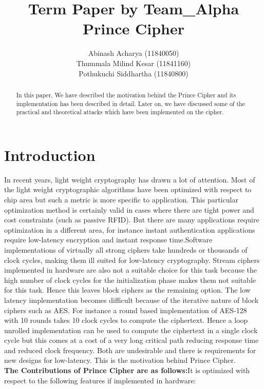 \documentclass{transcrypto}
\title{Term Paper by  Team\_Alpha \\ Prince Cipher}
\author{Abinash Acharya (11840050) \\ Thummala Milind Kesar (11841160) \\  Pothukuchi Siddhartha (11840800)}
\institute{Indian Institute of Technology Bhilai , \email{abinasha@iitbhilai.ac.in} \and Indian Institute of Technology Bhilai,\email{thummalam@iitbhilai.ac.in} \and Indian Institute of Technology Bhilai, \email{pothukuchis@iitbhilai.ac.in}}
\begin{document}
\maketitle
{} 

\begin{abstract}
In this paper, We have described the motivation behind the Prince Cipher and its implementation has been described in detail. Later on, we have discussed some of the practical and theoretical attacks which have been implemented on the cipher. 


\end{abstract}

\section{Introduction}
In recent years, light weight cryptography has drawn a lot of attention. Most of the light weight cryptographic algorithms have been optimized with respect to chip area but such a metric is more specific to application. This particular optimization method is certainly valid in cases where there are tight power and cost constraints (such as passive RFID). But there are many applications require optimization in a different area, for instance instant authentication applications require low-latency encryption and instant response time.Software implementations of virtually all strong ciphers take hundreds or thousands of clock cycles,
making them ill suited for low-latency cryptography. Stream ciphers implemented in hardware are also not a suitable choice for this task because the high number of clock cycles for the initialization phase makes them not suitable for this task. Hence this leaves block ciphers as the remaining option. The low latency implementation becomes difficult because of the iterative nature of block ciphers such as AES. For instance a round based implementation of AES-128 with 10 rounds takes 10 clock cycles to compute the ciphertext. Hence a loop unrolled implementation can be used to compute the ciphertext in a single clock cycle but this comes at a cost of a very long critical path reducing response time and reduced clock frequency. Both are undesirable and there is requirements for new designs for low-latency. This is the motivation behind Prince Cipher.\\
\textbf{The Contributions of Prince Cipher are as follows:}It is optimized with respect to the following features if implemented in hardware:\\
\end{document}
